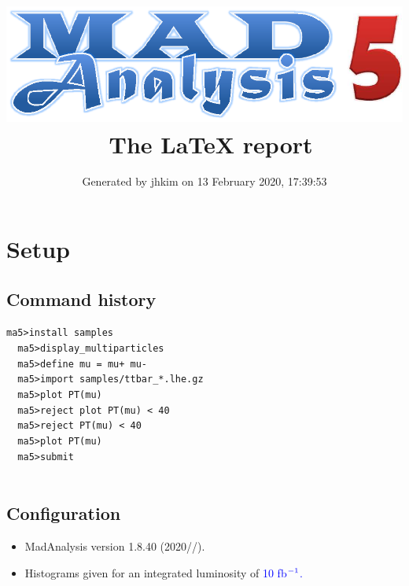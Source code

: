 \documentclass[a4paper, 10pt]{article}
\title{{\includegraphics[scale=.4]{logo.eps}}\ The LaTeX report}
\author{Generated by jhkim on 13 February 2020, 17:39:53}
\begin{document}
\maketitle
\flushbottom

\newpage
\section{ Setup}

\subsection{ Command history}

\texttt{ma5>install samples\\
}
\texttt{ }\texttt{ }\texttt{ma5>display\_multiparticles\\
}
\texttt{ }\texttt{ }\texttt{ma5>define mu = mu+ mu-\\
}
\texttt{ }\texttt{ }\texttt{ma5>import samples/\-ttbar\_*.lhe.gz\\
}
\texttt{ }\texttt{ }\texttt{ma5>plot PT(mu)\\
}
\texttt{ }\texttt{ }\texttt{ma5>reject plot PT(mu) < 40\\
}
\texttt{ }\texttt{ }\texttt{ma5>reject PT(mu) < 40\\
}
\texttt{ }\texttt{ }\texttt{ma5>plot PT(mu)\\
}
\texttt{ }\texttt{ }\texttt{ma5>submit\\
}
\texttt{ }\texttt{ }\subsection{ Configuration}

\begin{itemize}
  \item MadAnalysis version 1.8.40 (2020//).
   \item Histograms given for an integrated luminosity of \textcolor{blue}{10}\textcolor{blue}{ fb}$^{\textcolor{blue}{-1}}$\textcolor{blue}{.}
\textcolor{blue}{}
\end{itemize}
\newpage
\end{document}
